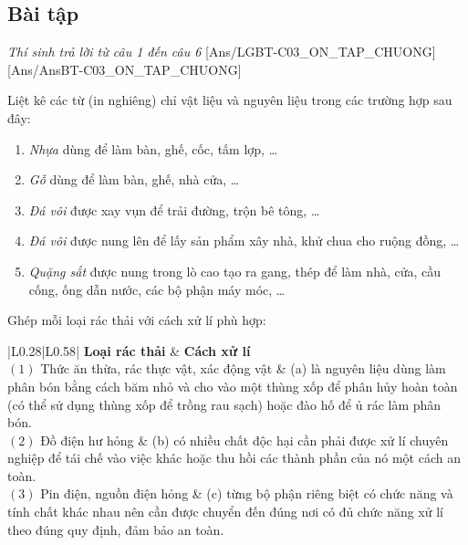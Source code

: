 \documentclass[Main.tex]{subfiles}
\begin{document}
\subsection{Bài tập}

\textit{\large Thí sinh trả lời từ câu 1 đến câu 6}
[Ans/LGBT-C03_ON_TAP_CHUONG]
[Ans/AnsBT-C03_ON_TAP_CHUONG]

\begin{bt}%
	Liệt kê các từ (in nghiêng) chỉ vật liệu và nguyên liệu trong các trường hợp sau đây:
	\begin{enumerate}
		\item[(a)] \textit{Nhựa} dùng để làm bàn, ghế, cốc, tấm lợp, …
		\item[(b)] \textit{Gỗ} dùng để làm bàn, ghế, nhà cửa, …
		\item[(c)] \textit{Đá vôi} được xay vụn để trải đường, trộn bê tông, …
		\item[(d)] \textit{Đá vôi} được nung lên để lấy sản phẩm xây nhà, khử chua cho ruộng đồng, …
		\item[(e)] \textit{Quặng sắt} được nung trong lò cao tạo ra gang, thép để làm nhà, cửa, cầu cống, ống dẫn nước, các bộ phận máy móc, …
	\end{enumerate}
\end{bt}

\begin{bt}%
	Ghép mỗi loại rác thải với cách xử lí phù hợp:
	\begin{center}
		\renewcommand{\arraystretch}{1.15}
		\begin{tabular}{|L{0.28\linewidth}|L{0.58\linewidth}|}
			\hline
			\textbf{Loại rác thải} & \textbf{Cách xử lí} \\
			\hline
			$(1)$ Thức ăn thừa, rác thực vật, xác động vật & (a) là nguyên liệu dùng làm phân bón bằng cách băm nhỏ và cho vào một thùng xốp để phân hủy hoàn toàn (có thể sử dụng thùng xốp để trồng rau sạch) hoặc đào hố để ủ rác làm phân bón. \\
			\hline
			$(2)$ Đồ điện hư hỏng & (b) có nhiều chất độc hại cần phải được xử lí chuyên nghiệp để tái chế vào việc khác hoặc thu hồi các thành phần của nó một cách an toàn. \\
			\hline
			$(3)$ Pin điện, nguồn điện hỏng & (c) từng bộ phận riêng biệt có chức năng và tính chất khác nhau nên cần được chuyển đến đúng nơi có đủ chức năng xử lí theo đúng quy định, đảm bảo an toàn. \\
			\hline
		\end{tabular}
	\end{center}
\end{bt}
\end{document}
